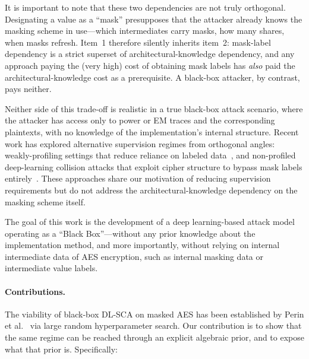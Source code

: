 \documentclass[runningheads]{llncs}
\begin{document}
It is important to note that these two dependencies are not truly orthogonal.
Designating a value as a ``mask'' presupposes that the attacker already knows the masking scheme in use---which intermediates carry masks, how many shares, when masks refresh.
Item~1 therefore silently inherits item~2: mask-label dependency is a strict superset of architectural-knowledge dependency, and any approach paying the (very high) cost of obtaining mask labels has \emph{also} paid the architectural-knowledge cost as a prerequisite.
A black-box attacker, by contrast, pays neither.

Neither side of this trade-off is realistic in a true black-box attack scenario, where the attacker has access only to power or EM traces and the corresponding plaintexts, with no knowledge of the implementation's internal structure.
Recent work has explored alternative supervision regimes from orthogonal angles: weakly-profiling settings that reduce reliance on labeled data~\cite{wu2024weakly}, and non-profiled deep-learning collision attacks that exploit cipher structure to bypass mask labels entirely~\cite{staib2023collision}.
These approaches share our motivation of reducing supervision requirements but do not address the architectural-knowledge dependency on the masking scheme itself.

The goal of this work is the development of a deep learning-based attack model operating as a ``Black Box''---without any prior knowledge about the implementation method, and more importantly, without relying on internal intermediate data of AES encryption, such as internal masking data or intermediate value labels.

\paragraph{Contributions.}
The viability of black-box DL-SCA on masked AES has been established by Perin et al.~\cite{perin2022exploring} via large random hyperparameter search.
Our contribution is to show that the same regime can be reached through an explicit algebraic prior, and to expose what that prior is.
Specifically:
\end{document}
